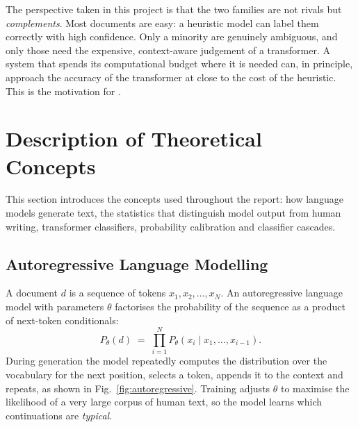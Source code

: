 The perspective taken in this project is that the two families are not rivals
but \emph{complements}. Most documents are easy: a heuristic model can label
them correctly with high confidence. Only a minority are genuinely ambiguous,
and only those need the expensive, context-aware judgement of a transformer.
A system that spends its computational budget where it is needed can,
in principle, approach the accuracy of the transformer at close to the cost of
the heuristic. This is the motivation for \veriscript.

\section{Description of Theoretical Concepts}
\label{sec:theory}

This section introduces the concepts used throughout the report: how
language models generate text, the statistics that distinguish model output
from human writing, transformer classifiers, probability calibration and
classifier cascades.

\subsection{Autoregressive Language Modelling}

A document $d$ is a sequence of tokens $x_1, x_2, \ldots, x_N$. An
autoregressive language model with parameters $\theta$ factorises the
probability of the sequence as a product of next-token conditionals:
\begin{equation}
  P_\theta(d) \;=\; \prod_{i=1}^{N} P_\theta\!\left(x_i \mid x_1,\ldots,x_{i-1}\right).
  \label{eq:autoregressive}
\end{equation}
During generation the model repeatedly computes the distribution over the
vocabulary for the next position, selects a token, appends it to the context
and repeats, as shown in Fig.~\ref{fig:autoregressive}. Training adjusts
$\theta$ to maximise the likelihood of a very large corpus of human text, so
the model learns which continuations are \emph{typical}.

